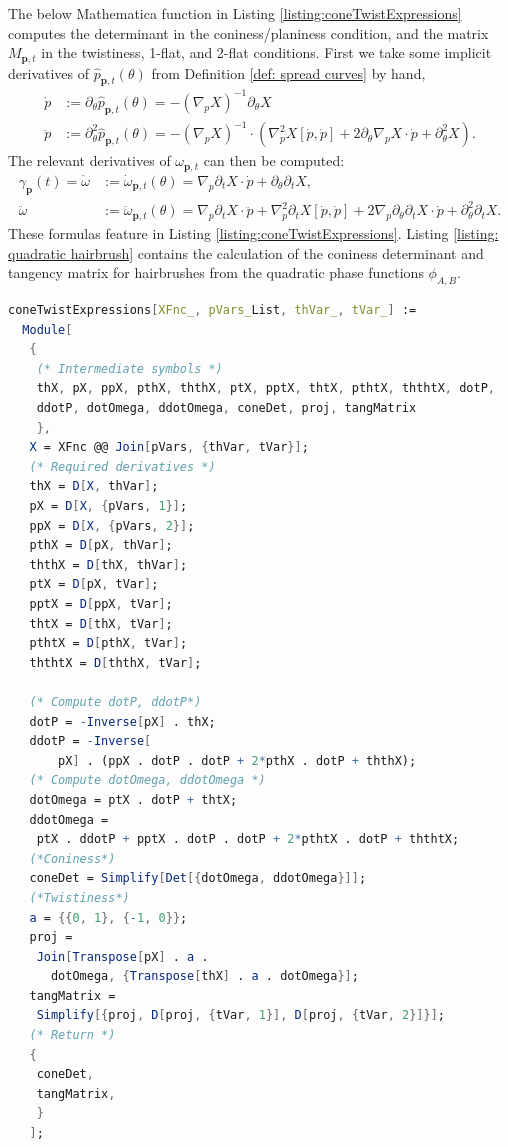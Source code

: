 \documentclass[12pt]{amsart}
\numberwithin{equation}{section}
\newcommand{\1}{\mathbbm{1}}
\newcommand{\p}{\mathbf p}
\begin{document}
The below Mathematica function in Listing \ref{listing:coneTwistExpressions} computes the determinant in the coniness/planiness condition, and the matrix $M_{\p,t}$ in the twistiness, 1-flat, and 2-flat conditions. First we take some implicit derivatives of $\hat p_{\p,t}(\theta)$ from Definition \ref{def: spread curves} by hand,
\begin{align}
    \dot p &:= \partial_\theta \hat p_{\p,t}(\theta) = -(\nabla_p X)^{-1} \partial_\theta X 
    \\
    \ddot p &:= \partial_\theta^2 \hat p_{\p,t}(\theta) = -(\nabla_p X)^{-1} \cdot (\nabla_p^2 X[\dot p, \dot p] + 2\partial_\theta \nabla_p X \cdot \dot p + \partial_\theta^2 X).
\end{align}
The relevant derivatives of $\omega_{\p,t}$ can then be computed: 
\begin{align}
    \gamma_{\p}(t) =\dot \omega &:= \dot \omega_{\p,t}(\theta) = \nabla_p \partial_t X \cdot \dot p + \partial_\theta \partial_t X,\\
    \ddot \omega &:= \ddot \omega_{\p,t}(\theta) = \nabla_p \partial_t X \cdot \ddot p + \nabla_p^2 \partial_t X[\dot p, \dot p] + 2 \nabla_p \partial_\theta \partial_t X \cdot \dot p + \partial_\theta^2 \partial_t X.
\end{align}
These formulas feature in Listing \ref{listing:coneTwistExpressions}. Listing \ref{listing: quadratic hairbrush} contains the calculation of the coniness determinant and tangency matrix for hairbrushes from the quadratic phase functions $\phi_{A,B}$. 

\begin{lstlisting}[language=Mathematica, caption={Coniness and Twistiness quantity calculations\label{listing:coneTwistExpressions}}, captionpos=t,basicstyle=\scriptsize\ttfamily]
coneTwistExpressions[XFnc_, pVars_List, thVar_, tVar_] :=
  Module[
   {
    (* Intermediate symbols *)
    thX, pX, ppX, pthX, ththX, ptX, pptX, thtX, pthtX, ththtX, dotP,
    ddotP, dotOmega, ddotOmega, coneDet, proj, tangMatrix
    },
   X = XFnc @@ Join[pVars, {thVar, tVar}];
   (* Required derivatives *)
   thX = D[X, thVar];
   pX = D[X, {pVars, 1}];
   ppX = D[X, {pVars, 2}];
   pthX = D[pX, thVar];
   ththX = D[thX, thVar];
   ptX = D[pX, tVar];
   pptX = D[ppX, tVar];
   thtX = D[thX, tVar];
   pthtX = D[pthX, tVar];
   ththtX = D[ththX, tVar];
   
   (* Compute dotP, ddotP*)
   dotP = -Inverse[pX] . thX;
   ddotP = -Inverse[
       pX] . (ppX . dotP . dotP + 2*pthX . dotP + ththX);
   (* Compute dotOmega, ddotOmega *)
   dotOmega = ptX . dotP + thtX;
   ddotOmega = 
    ptX . ddotP + pptX . dotP . dotP + 2*pthtX . dotP + ththtX;
   (*Coniness*)
   coneDet = Simplify[Det[{dotOmega, ddotOmega}]];
   (*Twistiness*)
   a = {{0, 1}, {-1, 0}};
   proj = 
    Join[Transpose[pX] . a . 
      dotOmega, {Transpose[thX] . a . dotOmega}];
   tangMatrix = 
    Simplify[{proj, D[proj, {tVar, 1}], D[proj, {tVar, 2}]}];
   (* Return *)
   {
    coneDet,
    tangMatrix,
    }
   ];
\end{lstlisting}
\end{document}

